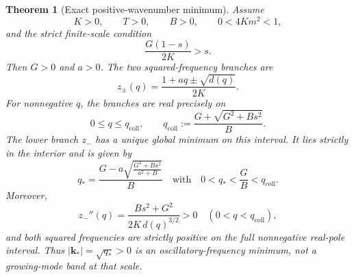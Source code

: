 \documentclass[11pt]{article}
\newtheorem{theorem}{Theorem}
\begin{document}
\begin{theorem}[Exact positive-wavenumber minimum]\label{thm:main}
Assume
\begin{equation}\label{eq:base}
 K>0,\qquad T>0,\qquad B>0,\qquad 0<4Km^2<1,
\end{equation}
and the strict finite-scale condition
\begin{equation}\label{eq:condition}
 \frac{G(1-s)}{2K}>s.
\end{equation}
Then $G>0$ and $a>0$.  The two squared-frequency branches are
\begin{equation}\label{eq:branches}
 z_{\pm}(q)=\frac{1+aq\pm\sqrt{d(q)}}{2K}.
\end{equation}
For nonnegative $q$, the branches are real precisely on
\begin{equation}\label{eq:domain}
 0\leq q\leq q_{\mathrm{coll}},\qquad
 q_{\mathrm{coll}}:=\frac{G+\sqrt{G^2+Bs^2}}{B}.
\end{equation}
The lower branch $z_-$ has a unique global minimum on this interval.
It lies strictly in the interior and is given by
\begin{equation}\label{eq:qstar}
 \boxed{\displaystyle
 q_* = \frac{G-a\sqrt{\frac{G^2+Bs^2}{a^2+B}}}{B}}
 \quad\text{with}\quad
 0<q_*<\frac{G}{B}<q_{\mathrm{coll}}.
\end{equation}
Moreover,
\begin{equation}\label{eq:convex}
 z_-''(q)=\frac{Bs^2+G^2}{2K\,d(q)^{3/2}}>0
 \quad (0<q<q_{\mathrm{coll}}),
\end{equation}
and both squared frequencies are strictly positive on the full
nonnegative real-pole interval.  Thus $|\mathbf{k}_*|=\sqrt{q_*}>0$
is an oscillatory-frequency minimum, not a growing-mode band at that scale.
\end{theorem}
\end{document}

